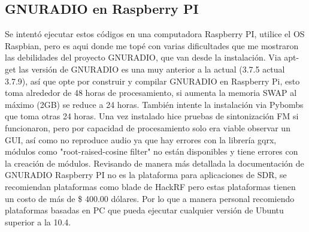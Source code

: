 \documentclass[preprint,12pt]{elsarticle}
\begin{document}
\subsection{GNURADIO en Raspberry PI}
Se intentó ejecutar estos códigos en una computadora Raspberry PI, utilice el OS Raspbian, pero es aqui donde me topé con varias dificultades que me mostraron las debilidades del proyecto GNURADIO, que van desde la instalación. Via apt-get las versión de GNURADIO es una muy anterior a la actual (3.7.5 actual 3.7.9), así que opte por construir y compilar GNURADIO en Raspberry Pi, esto toma alrededor de 48 horas de procesamiento, si aumenta la memoria SWAP al máximo (2GB) se reduce a 24 horas. También intente la instalación via Pybombs que toma otras 24 horas.
Una vez instalado hice pruebas de sintonización FM si funcionaron, pero por capacidad de procesamiento solo era viable observar un GUI, así como no reproduce audio ya que hay errores con la librería gqrx, módulos como "root-raised-cosine filter" no están disponibles y tiene errores con la creación de módulos. Revisando de manera más detallada la documentación de GNURADIO Raspberry PI no es la plataforma para aplicaciones de SDR, se recomiendan plataformas como blade de HackRF pero estas plataformas tienen un costo de más de \$ 400.00 dólares. Por lo que a manera personal recomiendo plataformas basadas en PC que pueda ejecutar cualquier versión de Ubuntu superior a la 10.4.


















\end{document}
